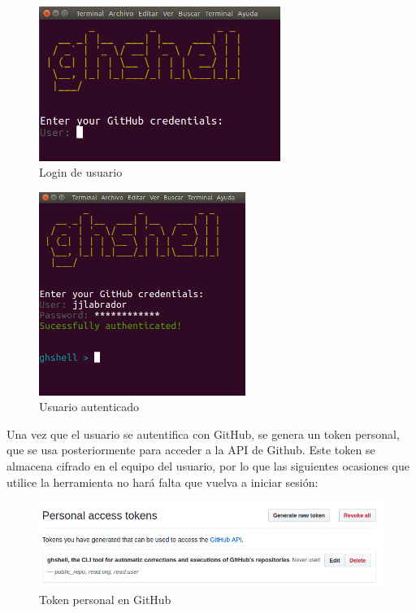     	\begin{figure}[H]
		\begin{center}
		\includegraphics[width=0.7\textwidth]{images/ghshell1}
		\caption{Login de usuario}
		\label{fig:ghshell1}
		\end{center}
		\end{figure}
		
 
 		\begin{figure}[H]
		\begin{center}
		\includegraphics[width=0.6\textwidth]{images/ghshell2-1}
		\caption{Usuario autenticado}
		\label{fig:ghshell2-1}
		\end{center}
		\end{figure}
		
    Una vez que el usuario se autentifica con GitHub, se genera un token personal, que se usa posteriormente para acceder a la API de Github. Este token se almacena cifrado en el equipo del usuario, por lo que las siguientes ocasiones que utilice la herramienta no hará falta que vuelva a iniciar sesión:
        
        \begin{figure}[H]
		\begin{center}
		\includegraphics[width=1\textwidth]{images/ghshell2-3}
		\caption{Token personal en GitHub}
		\label{fig:ghshell2-3}
		\end{center}
		\end{figure}
		
